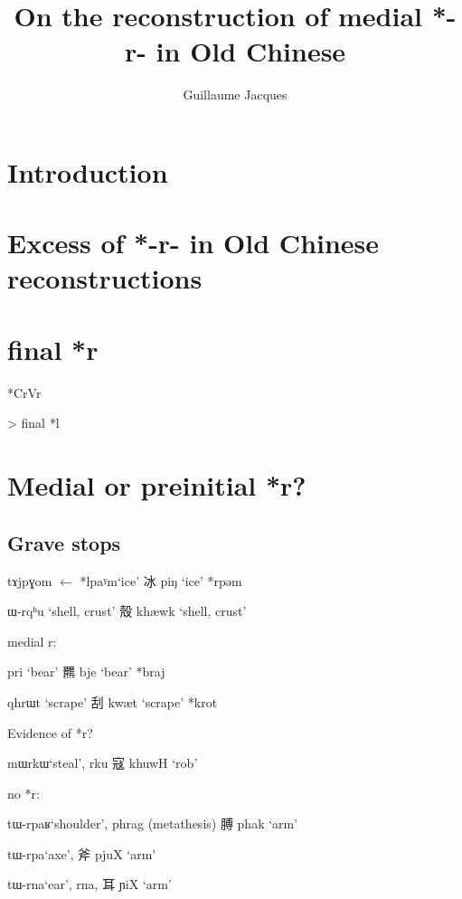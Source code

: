 \documentclass[oldfontcommands,oneside,a4paper,11pt]{article}
\newcommand{\ipa}[1]{{\phon \mbox{#1}}} %
\newcommand{\zh}[1]{{\cn #1}}
\newcommand{\ch}[3]{\zh{#1} \ipa{#2} `#3'}
\begin{document}
 
\title{On the reconstruction of medial *-r- in Old Chinese}
\author{Guillaume Jacques}
\maketitle
 

\section{Introduction}


\citet{handel02r}

\section{Excess of *-r- in Old Chinese reconstructions}

\section{final *r}
*CrVr

> final *\ipa{l}

\section{Medial or preinitial *r?}


\subsection{Grave stops}



\ipa{tɤjpɣom} $\leftarrow$ *\ipa{lpaˠm}`ice' \ch{冰}{piŋ}{ice} *\ipa{rpəm}

\ipa{ɯ-rqʰu} `shell, crust' \ch{殼}{khæwk}{shell, crust}



medial r:

\ipa{pri} `bear' \ch{羆}{bje}{bear} *braj

\ipa{qhrɯt} `scrape' \ch{刮}{kwæt}{scrape} *krot

Evidence of *r?

\ipa{mɯrkɯ}`steal', \ipa{rku} \ch{寇}{khuwH}{rob} 




no *r:

\ipa{tɯ-rpaʁ}`shoulder', \ipa{phrag} (metathesis) \ch{膊}{phak}{arm}

\ipa{tɯ-rpa}`axe', \ch{斧}{pjuX}{arm}

\ipa{tɯ-rna}`ear', \ipa{rna}, \ch{耳}{ɲiX}{arm}
\end{document}
